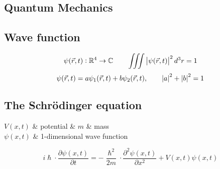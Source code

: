 \documentclass{article}
\begin{document}
\begin{twocolumn}
\section{Quantum Mechanics}

\begin{donotbrake}
\subsection{Wave function}
$$\psi(\vec{r}, t): \mathbb{R}^4 \rightarrow \mathbb{C} \qquad \iiint \left| \psi(\vec{r},t) \right|^2 d^3r = 1 $$
$$\psi(\vec{r}, t) = a \psi_1(\vec{r},t) + b \psi_2(\vec{r}, t), \qquad \left| a \right|^2 + \left| b \right|^2 = 1$$
\end{donotbrake}

\begin{donotbrake}
\subsection{The Schrödinger equation}

\begin{ddtabular}
	$V(x,t)$ & potential &
	$m$ & mass \\
	$\psi(x,t)$ & 1-dimensional wave function
\end{ddtabular}

$$i \hslash \cdot \frac{\partial \psi(x,t)}{\partial t} = - \frac{\hslash^2}{2m} \cdot \frac{\partial^2 \psi(x,t)}{\partial x^2} + V(x,t) \psi(x,t)$$

\end{donotbrake}


\end{twocolumn}
\end{document}
